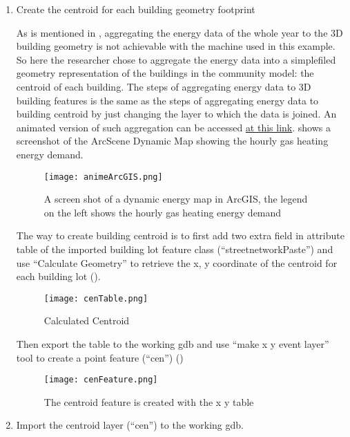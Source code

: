 \begin{enumerate}[1)]
\item Create the centroid for each building geometry footprint 

  As is mentioned in , aggregating the energy
  data of the whole year to the 3D building geometry is not achievable
  with the machine used in this example. So here the researcher chose
  to aggregate the energy data into a simplefiled geometry
  representation of the buildings in the community model: the centroid
  of each building. The steps of aggregating energy data to 3D
  building features is the same as the steps of aggregating energy
  data to building centroid by just changing the layer to which the
  data is joined. An animated version of such aggregation can be
  accessed
  \href{http://www.armechxyj.com/energy-mapping.html#arcgisAnime}{at
    this link}.  shows a screenshot of the
  ArcScene Dynamic Map showing the hourly gas heating energy demand.

\begin{figure}[h!]
  \centering
  \texttt{[image: animeArcGIS.png]}
  \caption[3D Dynamic Heat Map in ArcGIS]{A screen shot of a dynamic
    energy map in ArcGIS, the legend on the left shows the hourly gas
    heating energy demand}
  \label{fig:animeArcGIS}
\end{figure}

The way to create building centroid is to first add two extra field in
attribute table of the imported building lot feature class
(``streetnetworkPaste'') and use ``Calculate Geometry'' to retrieve
the x, y coordinate of the centroid for each building lot
().
\begin{figure}[h!]
  \centering
  \texttt{[image: cenTable.png]}
  \caption[Calculated Centroid]{Calculated Centroid}
  \label{fig:cenTable}
\end{figure}

Then export the table to the working gdb and use ``make x y event
layer'' tool to create a point feature (``cen'')
()
\begin{figure}[h!]
  \centering
  \texttt{[image: cenFeature.png]}
  \caption[Created Centroid Feature]{The centroid feature is created
    with the x y table}
  \label{fig:cenFeature}
\end{figure}

\item Import the centroid layer (``cen'') to the working gdb. 


\end{enumerate}
